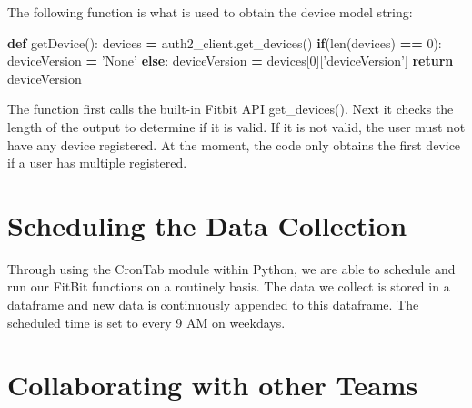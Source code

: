 \documentclass[]{book}
\newenvironment{Shaded}{\begin{snugshade}}{\end{snugshade}}
\newcommand{\KeywordTok}[1]{\textcolor[rgb]{0.13,0.29,0.53}{\textbf{#1}}}
\newcommand{\DecValTok}[1]{\textcolor[rgb]{0.00,0.00,0.81}{#1}}
\newcommand{\StringTok}[1]{\textcolor[rgb]{0.31,0.60,0.02}{#1}}
\newcommand{\ControlFlowTok}[1]{\textcolor[rgb]{0.13,0.29,0.53}{\textbf{#1}}}
\newcommand{\OperatorTok}[1]{\textcolor[rgb]{0.81,0.36,0.00}{\textbf{#1}}}
\newcommand{\BuiltInTok}[1]{#1}
\newcommand{\NormalTok}[1]{#1}
\begin{document}
The following function is what is used to obtain the device model
string:

\begin{Shaded}
\begin{Highlighting}[]
\KeywordTok{def}\NormalTok{ getDevice():}
\NormalTok{    devices }\OperatorTok{=}\NormalTok{ auth2_client.get_devices()}
    \ControlFlowTok{if}\NormalTok{(}\BuiltInTok{len}\NormalTok{(devices) }\OperatorTok{==} \DecValTok{0}\NormalTok{):}
\NormalTok{        deviceVersion }\OperatorTok{=} \StringTok{'None'}
    \ControlFlowTok{else}\NormalTok{:}
\NormalTok{        deviceVersion }\OperatorTok{=}\NormalTok{ devices[}\DecValTok{0}\NormalTok{][}\StringTok{'deviceVersion'}\NormalTok{]    }
    \ControlFlowTok{return}\NormalTok{ deviceVersion}
\end{Highlighting}
\end{Shaded}

The function first calls the built-in Fitbit API get\_devices(). Next it
checks the length of the output to determine if it is valid. If it is
not valid, the user must not have any device registered. At the moment,
the code only obtains the first device if a user has multiple
registered.

\section{Scheduling the Data
Collection}\label{scheduling-the-data-collection}

Through using the CronTab module within Python, we are able to schedule
and run our FitBit functions on a routinely basis. The data we collect
is stored in a dataframe and new data is continuously appended to this
dataframe. The scheduled time is set to every 9 AM on weekdays.

\section{Collaborating with other
Teams}\label{collaborating-with-other-teams}
\end{document}
